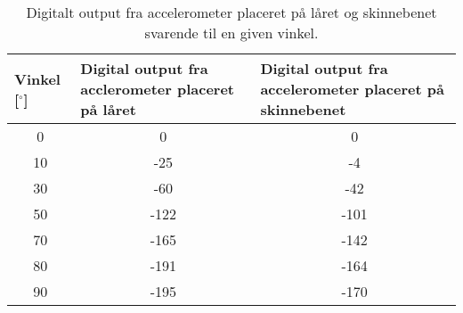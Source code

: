 \begin{table}[H]
\centering
\begin{tabular}{|c|c|c|}
\hline
\multicolumn{1}{|l|}{\textbf{Vinkel {[}$^{\circ}${]}}} & \multicolumn{1}{l|}{\textbf{Digital output fra acclerometer placeret på låret}} & \multicolumn{1}{l|}{\textbf{Digital output fra accelerometer placeret på skinnebenet}} \\ \hline
0                                                      & 0                                                                               & 0                                                                                      \\ \hline
10                                                     & -25                                                                             & -4                                                                                     \\ \hline
30                                                     & -60                                                                             & -42                                                                                    \\ \hline
50                                                     & -122                                                                            & -101                                                                                   \\ \hline
70                                                     & -165                                                                            & -142                                                                                   \\ \hline
80                                                     & -191                                                                            & -164                                                                                   \\ \hline
90                                                     & -195                                                                            & -170                                                                                   \\ \hline
\end{tabular}
\caption{Digitalt output fra accelerometer placeret på låret og skinnebenet svarende til en given vinkel.}
\label{tab:samlet_vinkel_imp}
\end{table}

